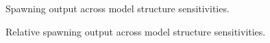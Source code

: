 \documentclass[
]{scrartcl}
\begin{document}
\begin{figure}


\caption{\label{fig-sens_model_spout}Spawning output across model
structure sensitivities.}

\end{figure}%

\begin{figure}


\caption{\label{fig-sens_model_status}Relative spawning output across
model structure sensitivities.}

\end{figure}%
\end{document}
